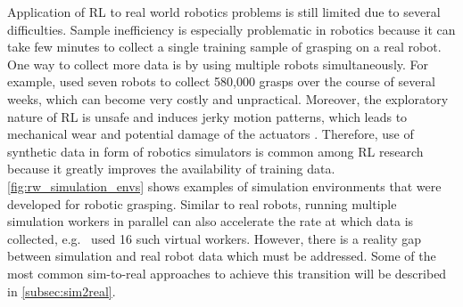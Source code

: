 Application of RL to real world robotics problems is still limited due to several difficulties. Sample inefficiency is especially problematic in robotics because it can take few minutes to collect a single training sample of grasping on a real robot. One way to collect more data is by using multiple robots simultaneously. For example, \citet{kalashnikov_qt-opt_2018} used seven robots to collect 580,000 grasps over the course of several weeks, which can become very costly and unpractical. Moreover, the exploratory nature of RL is unsafe and induces jerky motion patterns, which leads to mechanical wear and potential damage of the actuators \cite{kroemer_review_2021}. Therefore, use of synthetic data in form of robotics simulators is common among RL research because it greatly improves the availability of training data. \autoref{fig:rw_simulation_envs} shows examples of simulation environments that were developed for robotic grasping. Similar to real robots, running multiple simulation workers in parallel can also accelerate the rate at which data is collected, e.g.~\citet{popov_data-efficient_2017} used 16 such virtual workers. However, there is a reality gap between simulation and real robot data which must be addressed. Some of the most common sim-to-real approaches to achieve this transition will be described in \autoref{subsec:sim2real}.

